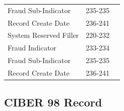 \documentclass[12pt,twoside]{article}
\begin{document}
\begin{longtable}{lrr}
 Fraud Sub-Indicator                  &            235-235  &                        \\
 Record Create Date                   &            236-241  &                        \\
 System Reserved Filler               &            220-232  &                        \\
 Fraud Indicator                      &            233-234  &                        \\
 Fraud Sub-Indicator                  &            235-235  &                        \\
 Record Create Date                   &            236-241  &                        \\
\hline
\end{longtable}

\normalsize
\subsection{CIBER 98 Record}
\label{sec-6-6}
\end{document}
